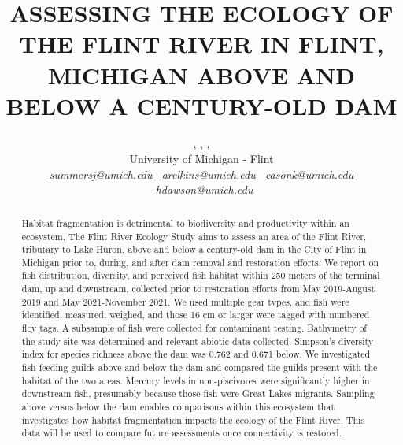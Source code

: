 \documentclass[a4paper, 12pt]{article} %
\date{} %
\begin{document}
\title{ASSESSING THE ECOLOGY OF THE FLINT RIVER IN FLINT, MICHIGAN ABOVE AND BELOW A CENTURY-OLD DAM}

\vspace{0.5cm}
\author{ , , ,   \\ %
       University of Michigan - Flint \\ %
       \textit{ \color{violet}
       \href{mailto:summersj@umich.edu}{summersj@umich.edu} \ \href{mailto:arelkins@umich.edu}{arelkins@umich.edu} \ \href{mailto:casonk@umich.edu}{casonk@umich.edu} \ \href{mailto:hdawson@umich.edu}{hdawson@umich.edu}}  %
       }%


\maketitle

\thispagestyle{empty}




\begin{abstract}
\vspace{0.5cm}

Habitat fragmentation is detrimental to biodiversity and productivity within an ecosystem. The Flint River Ecology Study aims to assess an area of the Flint River, tributary to Lake Huron, above and below a century-old dam in the City of Flint in Michigan prior to, during, and after dam removal and restoration efforts. We report on fish distribution, diversity, and perceived fish habitat within 250 meters of the terminal dam, up and downstream, collected prior to restoration efforts from May 2019-August 2019 and May 2021-November 2021. We used multiple gear types, and fish were identified, measured, weighed, and those 16 cm or larger were tagged with numbered floy tags. A subsample of fish were collected for contaminant testing. Bathymetry of the study site was determined and relevant abiotic data collected. Simpson’s diversity index for species richness above the dam was 0.762 and 0.671 below. We investigated fish feeding guilds above and below the dam and compared the guilds present with the habitat of the two areas. Mercury levels in non-piscivores were significantly higher in downstream fish, presumably because those fish were Great Lakes migrants. Sampling above versus below the dam enables comparisons within this ecosystem that investigates how habitat fragmentation impacts the ecology of the Flint River. This data will be used to compare future assessments once connectivity is restored.

\vspace{1.5cm}
\\
\vspace{5.5cm}

\end{abstract}
\end{document}
